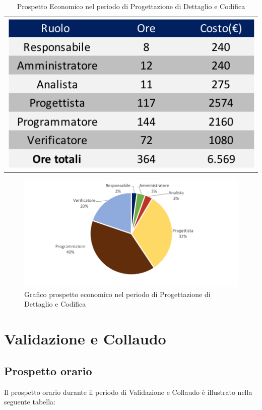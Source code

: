 \begin{table}[!ht]
	\begin{center}
		\begin{tabular}{c}
			\includegraphics{images/tabellaProgettazioneDettaglioCodificaEuro.png}
		\end{tabular}
		\caption{Prospetto Economico nel periodo di Progettazione di Dettaglio e Codifica}
	\end{center}
\end{table}

\begin{figure}[!ht]
	\begin{center}
		\includegraphics{images/grafoProgettazioneDettaglioCodificaEuro.png}
		\caption{Grafico prospetto economico nel periodo di Progettazione di Dettaglio e Codifica}
	\end{center}
\end{figure}

\newpage
\section{Validazione e Collaudo}
\subsection{Prospetto orario}
Il prospetto orario durante il periodo di Validazione e Collaudo è illustrato nella seguente tabella:

